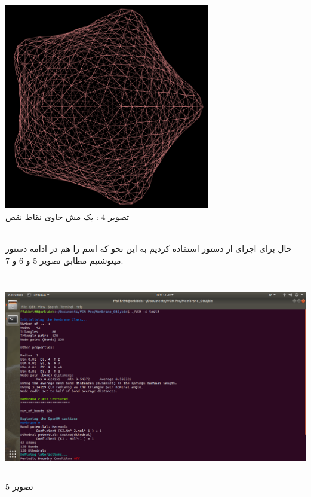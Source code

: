 \documentclass[12pt,onecolumn,a4paper]{report}
\begin{document}
{\begin{center}
\includegraphics[width=9cm, height=9cm]{04.png}\\
\caption{تصویر 4 : یک مش حاوی نقاط نقص}
\end{center}\\
حال برای اجرای  از دستور  استفاده کردیم به این نحو که اسم   را هم در ادامه دستور مینوشتیم مطابق تصویر 5 و 6 و 7.\\
\begin{center}
\includegraphics[width=16cm, height=9cm]{05.png}\\
\caption{تصویر 5}
\end{center}\\
\begin{center}

\end{center}}
\end{document}
